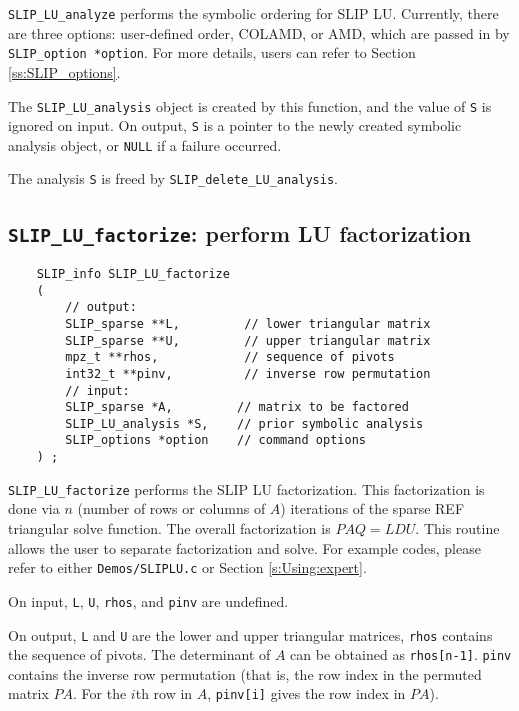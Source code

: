 \documentclass[12pt]{article}
\theoremstyle{definition}
\begin{document}
\verb|SLIP_LU_analyze| performs the symbolic ordering for SLIP LU. Currently,
there are three options: user-defined order, COLAMD, or AMD, which are passed
in by \verb|SLIP_option *option|. For more details, users can refer to Section
\ref{ss:SLIP_options}.

The \verb|SLIP_LU_analysis| object is created by this function, and the value
of \verb|S| is ignored on input.  On output, \verb|S| is a pointer to the newly
created symbolic analysis object, or \verb|NULL| if a failure occurred.

The analysis \verb|S| is freed by \verb|SLIP_delete_LU_analysis|.

\cprotect\subsection{\verb|SLIP_LU_factorize|: perform LU factorization}
\label{ss:SLIP_LU_factorize}

\begin{mdframed}[userdefinedwidth=6in]
{\footnotesize
\begin{verbatim}
    SLIP_info SLIP_LU_factorize
    (
        // output:
        SLIP_sparse **L,         // lower triangular matrix
        SLIP_sparse **U,         // upper triangular matrix
        mpz_t **rhos,            // sequence of pivots
        int32_t **pinv,          // inverse row permutation
        // input:
        SLIP_sparse *A,         // matrix to be factored
        SLIP_LU_analysis *S,    // prior symbolic analysis
        SLIP_options *option    // command options
    ) ;
\end{verbatim}
} \end{mdframed}

\verb|SLIP_LU_factorize| performs the SLIP LU factorization. This factorization
is done via $n$ (number of rows or columns of $A$) iterations of the sparse
REF triangular solve function. The overall factorization is $PAQ = LDU$.  This
routine allows the user to separate factorization and solve. For example codes,
please refer to either \verb|Demos/SLIPLU.c| or Section \ref{s:Using:expert}.

On input, \verb|L|, \verb|U|, \verb|rhos|, and \verb|pinv| are undefined.

On output, \verb|L| and \verb|U| are the lower and upper triangular matrices,
\verb|rhos| contains the sequence of pivots. The determinant of $A$ can be
obtained as \verb|rhos[n-1]|. \verb|pinv| contains the inverse row permutation
(that is, the row index in the permuted matrix $PA$. For the $i$th row in $A$,
\verb|pinv[i]| gives the row index in $PA$).
\end{document}
